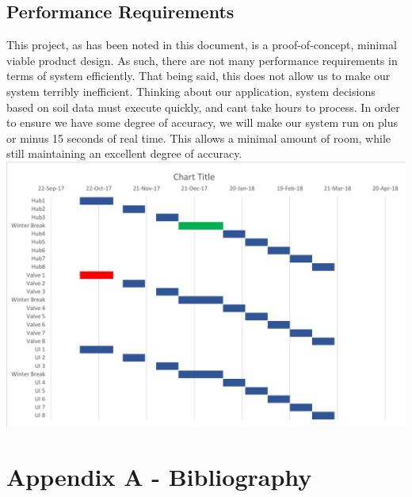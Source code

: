 \documentclass[onecolumn, draftclsnofoot,10pt, compsoc]{IEEEtran}
\begin{document}
\subsection{Performance Requirements}
This project, as has been noted in this document, is a proof-of-concept, minimal viable product design.
As such, there are not many performance requirements in terms of system efficiently.
That being said, this does not allow us to make our system terribly inefficient. 
Thinking about our application, system decisions based on soil data must execute quickly, and cant take hours to process. 
In order to ensure we have some degree of accuracy, we will make our system run on plus or minus 15 seconds of real time. 
This allows a minimal amount of room, while still maintaining an excellent degree of accuracy. 
	\noindent\includegraphics[width=\linewidth]{chart_cropped}
	
	\newpage
	\section{Appendix A - Bibliography}
	\nocite{*} %
	
	
	
\end{document}
